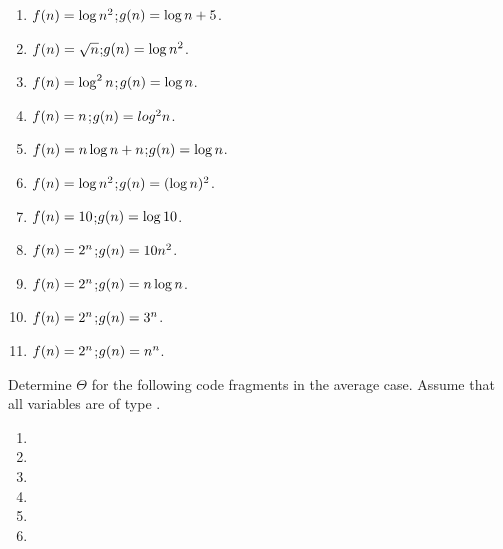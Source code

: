 \begin{exercises}
\begin{enumerate}
\item \(\mbox{$f(n)$} = \log n^2\);\quad \(\mbox{$g(n)$} = \log n + 5\).
\item \(\mbox{$f(n)$} = \sqrt{n}\);\quad \(\mbox{$g(n)$} = \log n^2\).
\item \(\mbox{$f(n)$} = \log^2 n\);\quad \(\mbox{$g(n)$} = \log n\).
\item \(\mbox{$f(n)$} = n\);\quad \(\mbox{$g(n)$} = log^2 n\).
\item \(\mbox{$f(n)$} = n \log n + n\);\quad \(\mbox{$g(n)$} = \log n\).
\item \(\mbox{$f(n)$} = \log n^2\);\quad \(\mbox{$g(n)$} = (\log n)^2\).
\item \(\mbox{$f(n)$} = 10\);\quad \(\mbox{$g(n)$} = \log 10\).
\item \(\mbox{$f(n)$} = 2^n\);\quad \(\mbox{$g(n)$} = 10 n^2\).
\item \(\mbox{$f(n)$} = 2^n\);\quad \(\mbox{$g(n)$} = n \log n\).
\item \(\mbox{$f(n)$} = 2^n\);\quad \(\mbox{$g(n)$} = 3^n\).
\item \(\mbox{$f(n)$} = 2^n\);\quad \(\mbox{$g(n)$} = n^n\).
\end{enumerate}

\item
Determine \(\Theta\) for the following code fragments in the average
case.
Assume that all variables are of type .

\begin{enumerate}

\vspace{-\bigskipamount}
\item {}

\vspace{-\medskipamount}
\vspace{-\bigskipamount}
\item {}

\vspace{-\medskipamount}
\vspace{-\bigskipamount}
\item {}

\vspace{-\medskipamount}
\vspace{-\bigskipamount}
\item {}

\vspace{-\medskipamount}
\vspace{-\bigskipamount}
\item {}

\vspace{-\medskipamount}
\vspace{-\bigskipamount}
\item {}


\end{enumerate}
\end{exercises}
